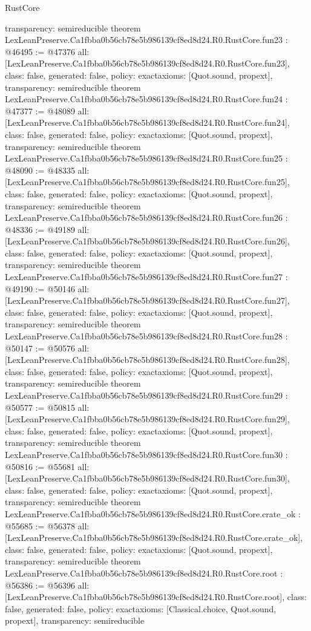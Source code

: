 \begin{lexlean}{RustCore}
\begin{coremodule}
{  transparency: semireducible
}
theorem LexLeanPreserve.Ca1fbba0b56cb78e5b986139cf8ed8d24.R0.RustCore.fun23 : @46495 := @47376 {
  all: [LexLeanPreserve.Ca1fbba0b56cb78e5b986139cf8ed8d24.R0.RustCore.fun23],
  class: false,
  generated: false,
  policy: exact{axioms: [Quot.sound, propext]},
  transparency: semireducible
}
theorem LexLeanPreserve.Ca1fbba0b56cb78e5b986139cf8ed8d24.R0.RustCore.fun24 : @47377 := @48089 {
  all: [LexLeanPreserve.Ca1fbba0b56cb78e5b986139cf8ed8d24.R0.RustCore.fun24],
  class: false,
  generated: false,
  policy: exact{axioms: [Quot.sound, propext]},
  transparency: semireducible
}
theorem LexLeanPreserve.Ca1fbba0b56cb78e5b986139cf8ed8d24.R0.RustCore.fun25 : @48090 := @48335 {
  all: [LexLeanPreserve.Ca1fbba0b56cb78e5b986139cf8ed8d24.R0.RustCore.fun25],
  class: false,
  generated: false,
  policy: exact{axioms: [Quot.sound, propext]},
  transparency: semireducible
}
theorem LexLeanPreserve.Ca1fbba0b56cb78e5b986139cf8ed8d24.R0.RustCore.fun26 : @48336 := @49189 {
  all: [LexLeanPreserve.Ca1fbba0b56cb78e5b986139cf8ed8d24.R0.RustCore.fun26],
  class: false,
  generated: false,
  policy: exact{axioms: [Quot.sound, propext]},
  transparency: semireducible
}
theorem LexLeanPreserve.Ca1fbba0b56cb78e5b986139cf8ed8d24.R0.RustCore.fun27 : @49190 := @50146 {
  all: [LexLeanPreserve.Ca1fbba0b56cb78e5b986139cf8ed8d24.R0.RustCore.fun27],
  class: false,
  generated: false,
  policy: exact{axioms: [Quot.sound, propext]},
  transparency: semireducible
}
theorem LexLeanPreserve.Ca1fbba0b56cb78e5b986139cf8ed8d24.R0.RustCore.fun28 : @50147 := @50576 {
  all: [LexLeanPreserve.Ca1fbba0b56cb78e5b986139cf8ed8d24.R0.RustCore.fun28],
  class: false,
  generated: false,
  policy: exact{axioms: [Quot.sound, propext]},
  transparency: semireducible
}
theorem LexLeanPreserve.Ca1fbba0b56cb78e5b986139cf8ed8d24.R0.RustCore.fun29 : @50577 := @50815 {
  all: [LexLeanPreserve.Ca1fbba0b56cb78e5b986139cf8ed8d24.R0.RustCore.fun29],
  class: false,
  generated: false,
  policy: exact{axioms: [Quot.sound, propext]},
  transparency: semireducible
}
theorem LexLeanPreserve.Ca1fbba0b56cb78e5b986139cf8ed8d24.R0.RustCore.fun30 : @50816 := @55681 {
  all: [LexLeanPreserve.Ca1fbba0b56cb78e5b986139cf8ed8d24.R0.RustCore.fun30],
  class: false,
  generated: false,
  policy: exact{axioms: [Quot.sound, propext]},
  transparency: semireducible
}
theorem LexLeanPreserve.Ca1fbba0b56cb78e5b986139cf8ed8d24.R0.RustCore.crate_ok : @55685 := @56378 {
  all: [LexLeanPreserve.Ca1fbba0b56cb78e5b986139cf8ed8d24.R0.RustCore.crate_ok],
  class: false,
  generated: false,
  policy: exact{axioms: [Quot.sound, propext]},
  transparency: semireducible
}
theorem LexLeanPreserve.Ca1fbba0b56cb78e5b986139cf8ed8d24.R0.RustCore.root : @56386 := @56396 {
  all: [LexLeanPreserve.Ca1fbba0b56cb78e5b986139cf8ed8d24.R0.RustCore.root],
  class: false,
  generated: false,
  policy: exact{axioms: [Classical.choice, Quot.sound, propext]},
  transparency: semireducible
}


\end{coremodule}
\end{lexlean}
